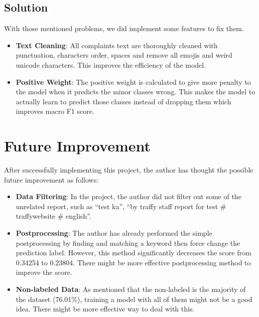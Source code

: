 \documentclass[12pt, a4paper]{article}
\begin{document}
            \subsection{Solution}
                \noindent With those mentioned problems, we did implement some features to fix them.
                \begin{itemize}
                    \item \textbf{Text Cleaning}: All complaints text are thoroughly cleaned with punctuation, characters order,
                    spaces and remove all emojis and weird unicode characters. This improves the efficiency of the model.
                    \item \textbf{Positive Weight}: The positive weight is calculated to give more penalty to the model when
                    it predicts the minor classes wrong. This makes the model to actually learn to predict those classes
                    instead of dropping them which improves macro F1 score.
                \end{itemize}

        \section{Future Improvement}
            After successfully implementing this project, the author has thought the possible future improvement as follows:
            \begin{itemize}
                \item \textbf{Data Filtering}: In the project, the author did not filter out some of the unrelated report, such as
                \enquote{test ka}, \enquote{by traffy staff report for test \# traffywebsite \# english}.
                \item \textbf{Postprocessing}: The author has already performed the simple postprocessing by finding and matching a keyword
                then force change the prediction label. However, this method significantly decreases the score from 0.34254 to 0.23804.
                There might be more effective postprocessing method to improve the score.
                \item \textbf{Non-labeled Data}: As mentioned that the non-labeled is the majority of the dataset (76.01\%),
                training a model with all of them might not be a good idea. There might be more effective way to deal with this.
            \end{itemize}
\end{document}
